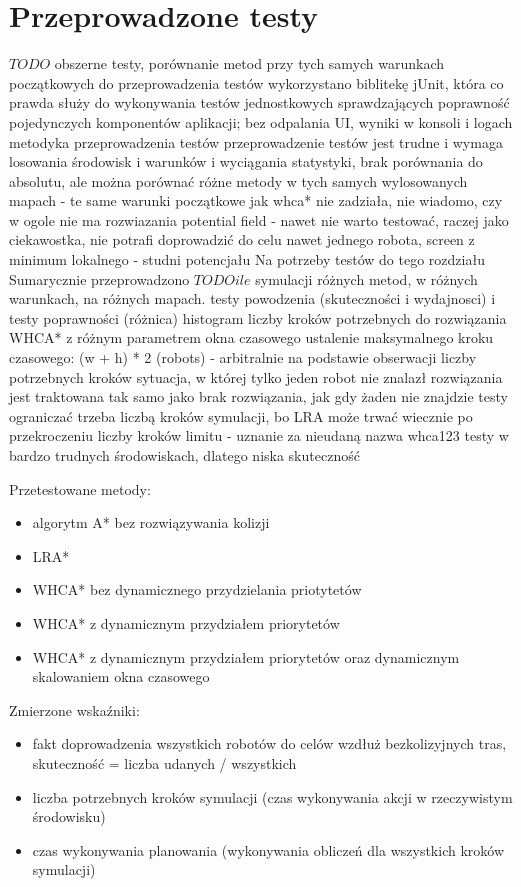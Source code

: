 \chapter{Przeprowadzone testy}
\label{ch:tests}

$TODO$
obszerne testy, porównanie metod przy tych samych warunkach początkowych
do przeprowadzenia testów wykorzystano biblitekę jUnit, która co prawda służy do wykonywania testów jednostkowych sprawdzających poprawność pojedynczych komponentów aplikacji; bez odpalania UI, wyniki w konsoli i logach
metodyka przeprowadzenia testów
przeprowadzenie testów jest trudne i wymaga losowania środowisk i warunków i wyciągania statystyki, brak porównania do absolutu, ale można porównać różne metody w tych samych wylosowanych mapach - te same warunki początkowe
jak whca* nie zadziała, nie wiadomo, czy w ogole nie ma rozwiazania
potential field - nawet nie warto testować, raczej jako ciekawostka, nie potrafi doprowadzić do celu nawet jednego robota, screen z minimum lokalnego - studni potencjału
Na potrzeby testów do tego rozdziału Sumarycznie przeprowadzono $TODO ile$ symulacji różnych metod, w różnych warunkach, na różnych mapach.
testy powodzenia (skuteczności i wydajnosci) i testy poprawności (różnica)
histogram liczby kroków potrzebnych do rozwiązania
WHCA* z różnym parametrem okna czasowego
ustalenie maksymalnego kroku czasowego: (w + h) * 2 (robots) - arbitralnie na podstawie obserwacji liczby potrzebnych kroków
sytuacja, w której tylko jeden robot nie znalazł rozwiązania jest traktowana tak samo jako brak rozwiązania, jak gdy żaden nie znajdzie
testy ograniczać trzeba liczbą kroków symulacji, bo LRA może trwać wiecznie
po przekroczeniu liczby kroków limitu - uznanie za nieudaną
nazwa whca123
testy w bardzo trudnych środowiskach, dlatego niska skuteczność

Przetestowane metody:
\begin{itemize}
	\item algorytm A* bez rozwiązywania kolizji
	\item LRA*
	\item WHCA* bez dynamicznego przydzielania priotytetów
	\item WHCA* z dynamicznym przydziałem priorytetów
	\item WHCA* z dynamicznym przydziałem priorytetów oraz dynamicznym skalowaniem okna czasowego
\end{itemize}

Zmierzone wskaźniki:
\begin{itemize}
	\item fakt doprowadzenia wszystkich robotów do celów wzdłuż bezkolizyjnych tras, skuteczność = liczba udanych / wszystkich
	\item liczba potrzebnych kroków symulacji (czas wykonywania akcji w rzeczywistym środowisku)
	\item czas wykonywania planowania (wykonywania obliczeń dla wszystkich kroków symulacji)
\end{itemize}

